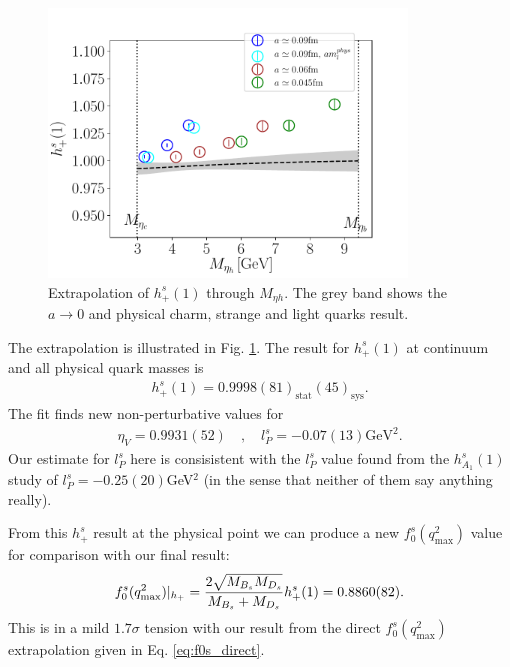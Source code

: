 \begin{figure}[htb!]
  \begin{center}
    \includegraphics[width=0.85\textwidth]{images/BsDs/hplus_vsmh.pdf}
    \caption{Extrapolation of $h^s_+(1)$ through $M_{\eta{h}}$. The grey band shows the $a\to 0$ and physical charm, strange and light quarks result. \label{fig:hplus_extrap}}
  \end{center}
\end{figure}

The extrapolation is illustrated in Fig. \ref{fig:hplus_extrap}. The result for $h^s_+(1)$ at continuum and all physical quark masses is
\begin{align}
  h_+^s(1) = 0.9998(81)_{\text{stat}}(45)_{\text{sys}}.
\end{align}
The fit finds new non-perturbative values for
\begin{align}
  \eta_V = 0.9931(52) \quad,\quad l_P^s = -0.07(13) \text{GeV}^2.
\end{align}
Our estimate for $l_P^s$ here is consisistent with the $l_P^s$ value found from the $h^s_{A_1}(1)$ study of $l_P^s=-0.25(20)$GeV$^2$ (in the sense that neither of them say anything really).

From this $h^s_+$ result at the physical point we can produce a new $f^s_0(q^2_{\text{max}})$ value for comparison with our final result:
\begin{align}
  f^s_0(q^2_{\text{max}})|_{h_+} = {2\sqrt{ M_{B_s}M_{D_s} }\over M_{B_s}+M_{D_s}} h^s_+(1) = 0.8860(82).
\end{align}
This is in a mild $1.7\sigma$ tension with our result from the direct $f^s_0(q^2_{\text{max}})$ extrapolation given in Eq. \eqref{eq:f0s_direct}.

